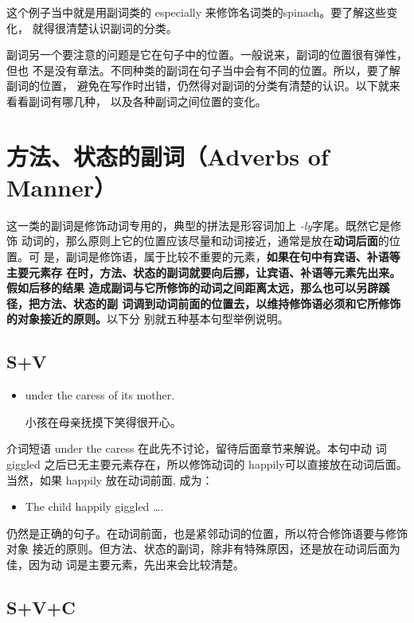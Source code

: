 这个例子当中就是用副词类的 especially 来修饰名词类的spinach。要了解这些变化，
就得很清楚认识副词的分类。

副词另一个要注意的问题是它在句子中的位置。一般说来，副词的位置很有弹性，但也
不是没有章法。不同种类的副词在句子当中会有不同的位置。所以，要了解副词的位置，
避免在写作时出错，仍然得对副词的分类有清楚的认识。以下就来看看副词有哪几种，
以及各种副词之间位置的变化。

\section{方法、状态的副词（Adverbs of Manner）}

这一类的副词是修饰动词专用的，典型的拼法是形容词加上 \emph{-ly}字尾。既然它是修饰
动词的，那么原则上它的位置应该尽量和动词接近，通常是放在\textbf{动词后面}的位置。可
是，副词是修饰语，属于比较不重要的元素，\textbf{如果在句中有宾语、补语等主要元素存
  在时，方法、状态的副词就要向后挪，让宾语、补语等元素先出来。假如后移的结果
  造成副词与它所修饰的动词之间距离太远，那么也可以另辟蹊径，把方法、状态的副
  词调到动词前面的位置去，以维持修饰语必须和它所修饰的对象接近的原则。}以下分
别就五种基本句型举例说明。

\subsection{S+V}

\begin{itemize}
\item  {}   under the caress of its mother.

  小孩在母亲抚摸下笑得很开心。
\end{itemize}

介词短语 under the caress 在此先不讨论，留待后面章节来解说。本句中动
词giggled 之后已无主要元素存在，所以修饰动词的 happily可以直接放在动词后面。
当然，如果 happily 放在动词前面, 成为：
\begin{itemize}
\item  The child happily giggled \ldots.
\end{itemize}
仍然是正确的句子。在动词前面，也是紧邻动词的位置，所以符合修饰语要与修饰对象
接近的原则。但方法、状态的副词，除非有特殊原因，还是放在动词后面为佳，因为动
词是主要元素，先出来会比较清楚。

\subsection{S+V+C}

